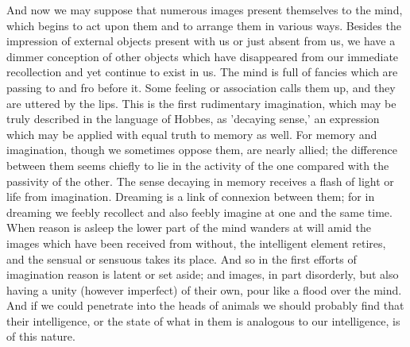 \documentclass[11pt,letter]{article}
\begin{document}
\par  And now we may suppose that numerous images present themselves to the mind, which begins to act upon them and to arrange them in various ways. Besides the impression of external objects present with us or just absent from us, we have a dimmer conception of other objects which have disappeared from our immediate recollection and yet continue to exist in us. The mind is full of fancies which are passing to and fro before it. Some feeling or association calls them up, and they are uttered by the lips. This is the first rudimentary imagination, which may be truly described in the language of Hobbes, as 'decaying sense,' an expression which may be applied with equal truth to memory as well. For memory and imagination, though we sometimes oppose them, are nearly allied; the difference between them seems chiefly to lie in the activity of the one compared with the passivity of the other. The sense decaying in memory receives a flash of light or life from imagination. Dreaming is a link of connexion between them; for in dreaming we feebly recollect and also feebly imagine at one and the same time. When reason is asleep the lower part of the mind wanders at will amid the images which have been received from without, the intelligent element retires, and the sensual or sensuous takes its place. And so in the first efforts of imagination reason is latent or set aside; and images, in part disorderly, but also having a unity (however imperfect) of their own, pour like a flood over the mind. And if we could penetrate into the heads of animals we should probably find that their intelligence, or the state of what in them is analogous to our intelligence, is of this nature.
\end{document}
